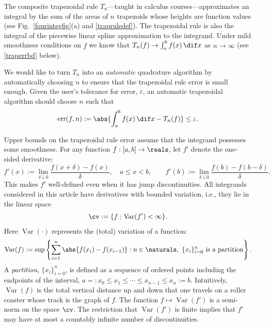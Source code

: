 \documentclass[]{article}
\DeclareMathOperator{\Var}{Var}
\DeclareMathOperator{\err}{err}
\theoremstyle{definition}
\theoremstyle{remark}
\newcommand{\datasites}{\{x_i\}_{i=0}^n}
\begin{document}
The composite trapezoidal rule $T_n$---taught in calculus courses---approximates an integral by the sum of the areas of $n$ trapezoids whose heights are function values (see Fig.\ \ref{fourintegfig}(a) and \eqref{trapruledef}). The trapezoidal rule is also the integral of the piecewise linear spline approximation to the integrand. Under mild smoothness conditions on $f$ we know that $T_n(f) \to \int_a^b f(x) \, \dif x$ as $n \to \infty$ (see \eqref{traperrbd} below). 

We would like to turn $T_n$ into an \emph{automatic} quadrature algorithm by automatically choosing $n$ to ensure that the trapezoidal rule error is small enough.  Given the user's tolerance for error, $\varepsilon$, an automatic trapezoidal algorithm should choose $n$ such that 
\begin{equation} \label{errdef}
\err(f,n) := \abs{\int_a^b f(x) \, \dif x - T_n(f)} \le \varepsilon.
\end{equation}

Upper bounds on the trapezoidal rule error assume that the integrand possesses some smoothness.  For any function $f:[a,b]\to \reals$, let $f'$ denote the one-sided derivative:
\[
f'(x):=\lim_{\delta \downarrow 0} \frac{f(x+\delta)-f(x)}{\delta}, \quad a \le x < b, \qquad f'(b):=\lim_{\delta \downarrow 0} \frac{f(b)-f(b-\delta)}{\delta}.
\]
This makes $f'$ well-defined even when it has jump discontinuities.  All integrands considered in this article have derivatives with bounded variation, i.e., they lie in the linear space
\[
\cv:=\{f : \Var(f')<\infty \}.
\]
Here $\Var(\cdot)$ represents the (total) variation of a function:
\begin{equation} \label{vardef}
\Var(f) \\
:= \sup \left \{ \sum_{i=1}^n \abs{f(x_i)-f(x_{i-1})} : n \in \naturals, \ \datasites \text{ is a partition} \right\}.
\end{equation}
A \emph{partition}, $\datasites$, is defined as a sequence of ordered points including the endpoints of the interval,  $a=:x_0 \le x_1 \le \cdots \le x_{n-1} \le x_{n}:=b$.  Intuitively, $\Var(f)$ is the total vertical distance up and down that one travels on a roller coaster whose track is the graph of $f$. The function $f \mapsto \Var(f')$ is a semi-norm on the space $\cv$. The restriction that $\Var(f')$ is finite implies that $f'$ may have at most a countably infinite number of discontinuities.
\end{document}

